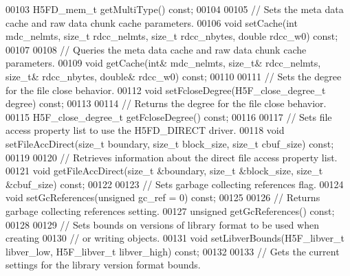 \begin{DoxyCode}
00103         H5FD\_mem\_t getMultiType() \textcolor{keyword}{const};
00104 
00105         \textcolor{comment}{// Sets the meta data cache and raw data chunk cache parameters.}
00106         \textcolor{keywordtype}{void} setCache(\textcolor{keywordtype}{int} mdc\_nelmts, \textcolor{keywordtype}{size\_t} rdcc\_nelmts, \textcolor{keywordtype}{size\_t} rdcc\_nbytes, \textcolor{keywordtype}{double} rdcc\_w0) \textcolor{keyword}{const};
00107 
00108         \textcolor{comment}{// Queries the meta data cache and raw data chunk cache parameters.}
00109         \textcolor{keywordtype}{void} getCache(\textcolor{keywordtype}{int}& mdc\_nelmts, \textcolor{keywordtype}{size\_t}& rdcc\_nelmts, \textcolor{keywordtype}{size\_t}& rdcc\_nbytes, \textcolor{keywordtype}{double}& rdcc\_w0) \textcolor{keyword}{const};
00110 
00111         \textcolor{comment}{// Sets the degree for the file close behavior.}
00112         \textcolor{keywordtype}{void} setFcloseDegree(H5F\_close\_degree\_t degree) \textcolor{keyword}{const};
00113 
00114         \textcolor{comment}{// Returns the degree for the file close behavior.}
00115         H5F\_close\_degree\_t getFcloseDegree() \textcolor{keyword}{const};
00116 
00117         \textcolor{comment}{// Sets file access property list to use the H5FD\_DIRECT driver.}
00118         \textcolor{keywordtype}{void} setFileAccDirect(\textcolor{keywordtype}{size\_t} boundary, \textcolor{keywordtype}{size\_t} block\_size, \textcolor{keywordtype}{size\_t} cbuf\_size) \textcolor{keyword}{const};
00119 
00120         \textcolor{comment}{// Retrieves information about the direct file access property list.}
00121         \textcolor{keywordtype}{void} getFileAccDirect(\textcolor{keywordtype}{size\_t} &boundary, \textcolor{keywordtype}{size\_t} &block\_size, \textcolor{keywordtype}{size\_t} &cbuf\_size) \textcolor{keyword}{const};
00122 
00123         \textcolor{comment}{// Sets garbage collecting references flag.}
00124         \textcolor{keywordtype}{void} setGcReferences(\textcolor{keywordtype}{unsigned} gc\_ref = 0) \textcolor{keyword}{const};
00125 
00126         \textcolor{comment}{// Returns garbage collecting references setting.}
00127         \textcolor{keywordtype}{unsigned} getGcReferences() \textcolor{keyword}{const};
00128 
00129         \textcolor{comment}{// Sets bounds on versions of library format to be used when creating}
00130         \textcolor{comment}{// or writing objects.}
00131         \textcolor{keywordtype}{void} setLibverBounds(H5F\_libver\_t libver\_low, H5F\_libver\_t libver\_high) \textcolor{keyword}{const};
00132 
00133         \textcolor{comment}{// Gets the current settings for the library version format bounds.}

\end{DoxyCode}

